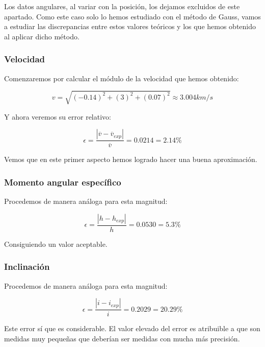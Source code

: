 \documentclass{article}
\numberwithin{equation}{section}
\begin{document}
Los datos angulares, al variar con la posición, los dejamos excluidos de este apartado. Como este caso solo lo hemos estudiado con el método de Gauss, vamos a estudiar las discrepancias entre estos valores teóricos y los que hemos obtenido al aplicar dicho método.

\subsubsection{Velocidad}

Comenzaremos por calcular el módulo de la velocidad que hemos obtenido:

\begin{equation*}
    v=\sqrt{(-0.14)^2+(3)^2+(0.07)^2}\approx3.004 km/s
\end{equation*}

Y ahora veremos su error relativo:

\begin{equation*}
    \epsilon=\frac{\left\lvert \overline{v}-\overline{v}_{exp} \right\rvert }{\overline{v}}=0.0214=2.14\%
\end{equation*}

Vemos que en este primer aspecto hemos logrado hacer una buena aproximación.

\subsubsection{Momento angular específico}
Procedemos de manera análoga para esta magnitud:

\begin{equation*}
    \epsilon=\frac{\left\lvert h-h_{exp} \right\rvert}{h}=0.0530=5.3\%
\end{equation*}

Consiguiendo un valor aceptable.

\subsubsection{Inclinación}
Procedemos de manera análoga para esta magnitud:

\begin{equation*}
    \epsilon=\frac{\left\lvert i-i_{exp} \right\rvert}{i}=0.2029=20.29\%
\end{equation*}

Este error sí que es considerable. El valor elevado del error es atribuible a que son medidas muy pequeñas que deberían ser medidas con mucha más precisión. 
\end{document}
